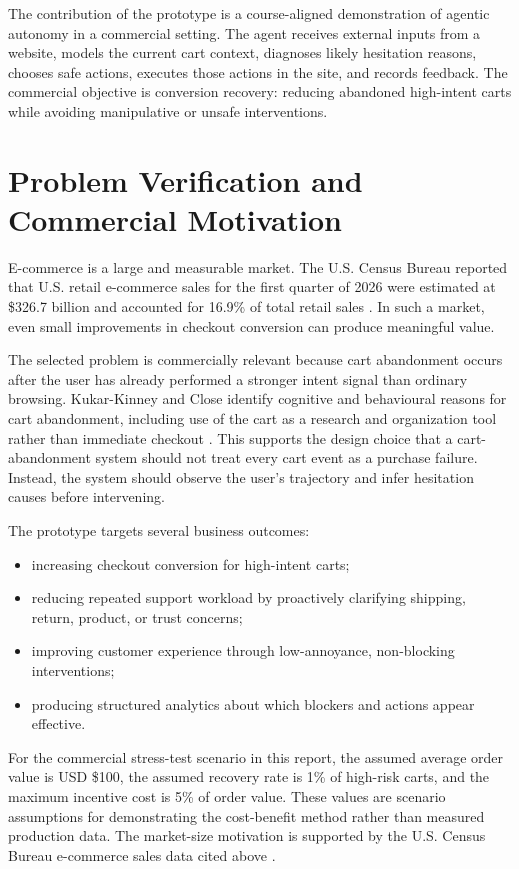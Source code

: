 \documentclass{article}
\begin{document}
The contribution of the prototype is a course-aligned demonstration of agentic autonomy in a commercial setting. The agent receives external inputs from a website, models the current cart context, diagnoses likely hesitation reasons, chooses safe actions, executes those actions in the site, and records feedback. The commercial objective is conversion recovery: reducing abandoned high-intent carts while avoiding manipulative or unsafe interventions.

\section{Problem Verification and Commercial Motivation}
E-commerce is a large and measurable market. The U.S. Census Bureau reported that U.S. retail e-commerce sales for the first quarter of 2026 were estimated at \$326.7 billion and accounted for 16.9\% of total retail sales \cite{census2026ecommerce}. In such a market, even small improvements in checkout conversion can produce meaningful value.

The selected problem is commercially relevant because cart abandonment occurs after the user has already performed a stronger intent signal than ordinary browsing. Kukar-Kinney and Close identify cognitive and behavioural reasons for cart abandonment, including use of the cart as a research and organization tool rather than immediate checkout \cite{kukar2010cart}. This supports the design choice that a cart-abandonment system should not treat every cart event as a purchase failure. Instead, the system should observe the user's trajectory and infer hesitation causes before intervening.

The prototype targets several business outcomes:
\begin{itemize}[leftmargin=*]
  \item increasing checkout conversion for high-intent carts;
  \item reducing repeated support workload by proactively clarifying shipping, return, product, or trust concerns;
  \item improving customer experience through low-annoyance, non-blocking interventions;
  \item producing structured analytics about which blockers and actions appear effective.
\end{itemize}

For the commercial stress-test scenario in this report, the assumed average order value is USD \$100, the assumed recovery rate is 1\% of high-risk carts, and the maximum incentive cost is 5\% of order value. These values are scenario assumptions for demonstrating the cost-benefit method rather than measured production data. The market-size motivation is supported by the U.S. Census Bureau e-commerce sales data cited above \cite{census2026ecommerce}.
\end{document}
